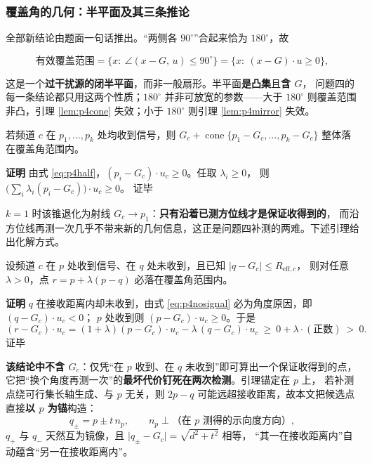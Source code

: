 \documentclass[withoutpreface, bwprint]{cumcmthesis}
\renewenvironment{proof}{\par\noindent\textbf{证明}\quad}{\hfill 证毕\par\medskip}
\begin{document}
\subsubsection{覆盖角的几何：半平面及其三条推论}

全部新结论由题面一句话推出。“两侧各 $90^\circ$”合起来恰为 $180^\circ$，故

\begin{equation}
  \label{eq:p4half}
  \text{有效覆盖范围}
  =\{x:\ \angle(x-G,\,u)\le 90^\circ\}
  =\{x:\ (x-G)\cdot u\ge 0\},
\end{equation}

这是一个\textbf{过干扰源的闭半平面}，而非一般扇形。半平面\textbf{是凸集}且\textbf{含 $G$}，
问题四的每一条结论都只用这两个性质；$180^\circ$ 并非可放宽的参数——大于 $180^\circ$
则覆盖范围非凸，引理 \ref{lem:p4cone} 失效；小于 $180^\circ$ 则引理 \ref{lem:p4mirror} 失效。

\begin{lemma}[收信锥]
\label{lem:p4cone}
若频道 $c$ 在 $p_1,\dots,p_k$ 处均收到信号，则
$G_c+\operatorname{cone}\{p_1-G_c,\dots,p_k-G_c\}$ 整体落在覆盖角范围内。
\end{lemma}

\begin{proof}
由式 \eqref{eq:p4half}，$(p_i-G_c)\cdot u_c\ge 0$。任取 $\lambda_i\ge0$，
则 $\bigl(\sum_i\lambda_i(p_i-G_c)\bigr)\cdot u_c\ge 0$。
\end{proof}

$k=1$ 时该锥退化为射线 $G_c\to p_1$：\textbf{只有沿着已测方位线才是保证收得到的}，
而沿方位线再测一次几乎不带来新的几何信息，这正是问题四补测的两难。下述引理给出化解方式。

\begin{lemma}[镜像必达]
\label{lem:p4mirror}
设频道 $c$ 在 $p$ 处收到信号、在 $q$ 处未收到，且已知 $\lvert q-G_c\rvert\le R_{\mathrm{eff},c}$，
则对任意 $\lambda>0$，点 $r=p+\lambda(p-q)$ 必落在覆盖角范围内。
\end{lemma}

\begin{proof}
$q$ 在接收距离内却未收到，由式 \eqref{eq:p4nosignal} 必为角度原因，即 $(q-G_c)\cdot u_c<0$；
$p$ 处收到则 $(p-G_c)\cdot u_c\ge 0$。于是
\begin{equation*}
  (r-G_c)\cdot u_c=(1+\lambda)(p-G_c)\cdot u_c-\lambda\,(q-G_c)\cdot u_c
  \ \ge\ 0+\lambda\cdot(\text{正数})\ >\ 0. 
\end{equation*}
\end{proof}

\textbf{该结论中不含 $G_c$}：仅凭“在 $p$ 收到、在 $q$ 未收到”即可算出一个保证收得到的点，
它把“换个角度再测一次”的\textbf{最坏代价钉死在两次检测}。引理锚定在 $p$ 上，
若补测点绕可行集长轴生成、与 $p$ 无关，则 $2p-q$ 可能远超接收距离，故本文把候选点
直接\textbf{以 $p$ 为锚}构造：
\begin{equation}
  \label{eq:p4pair}
  q_\pm=p\pm t\,n_p,\qquad n_p\perp\text{（在 $p$ 测得的示向度方向）},
\end{equation}
$q_+$ 与 $q_-$ 天然互为镜像，且 $\lvert q_\pm-G_c\rvert=\sqrt{d^2+t^2}$ 相等，
“其一在接收距离内”自动蕴含“另一在接收距离内”。
\end{document}
